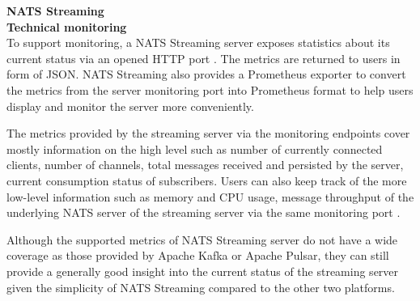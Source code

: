 \large \textbf{NATS Streaming}\\
\normalsize
\textbf{Technical monitoring}\\
To support monitoring, a NATS Streaming server exposes statistics about its current status via an opened HTTP port \cite{natsmonitoring}. The metrics are returned to users in form of JSON. NATS Streaming also provides a Prometheus exporter to convert the metrics from the server monitoring port into Prometheus format to help users display and monitor the server more conveniently. 

The metrics provided by the streaming server via the monitoring endpoints cover mostly information on the high level such as number of currently connected clients, number of channels, total messages received and persisted by the server, current consumption status of subscribers. Users can also keep track of the more low-level information such as memory and CPU usage, message throughput of the underlying NATS server of the streaming server via the same monitoring port \cite{normalnatsconfig}. 

Although the supported metrics of NATS Streaming server do not have a wide coverage as those provided by Apache Kafka or Apache Pulsar, they can still provide a generally good insight into the current status of the streaming server given the simplicity of NATS Streaming compared to the other two platforms.

